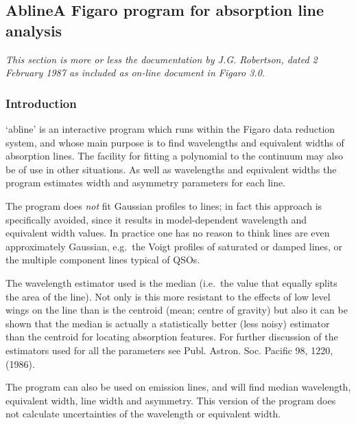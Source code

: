 
\subsection{\label{techno11}Abline\latorhtm{---}{-}A
   Figaro program for absorption line analysis}

{\em
   This section is more or less the documentation by J.G. Robertson,
   dated 2 February 1987 as included as on-line document in Figaro 3.0.
\/}


\subsubsection{\label{techno11intro}Introduction}

   `abline' is an interactive program which runs within the Figaro data
   reduction system, and whose main purpose is to find wavelengths and
   equivalent widths of absorption lines. The facility for fitting a
   polynomial to the continuum may also be of use in other situations.
   As well as wavelengths and equivalent widths the program estimates
   width and asymmetry parameters for each line.

   The program does {\em not\/}
   fit Gaussian profiles to lines; in fact this approach is specifically
   avoided, since it results in model-dependent wavelength and
   equivalent width values. In practice one has no reason to think lines
   are even approximately Gaussian, e.g.\ the Voigt profiles of saturated
   or damped lines, or the multiple component lines typical of QSOs.

   The wavelength estimator used is the median (i.e.\ the value that
   equally splits the area of the line). Not only is this more resistant
   to the effects of low level wings on the line than is the centroid
   (mean; centre of gravity) but also it can be shown that the median is
   actually a statistically better (less noisy) estimator than the
   centroid for locating absorption features.  For further discussion of
   the estimators used for all the parameters see Publ. Astron. Soc.
   Pacific 98, 1220, (1986).

   The program can also be used on emission lines, and will find median
   wavelength, equivalent width, line width and asymmetry. This version
   of the program does not calculate uncertainties of the wavelength or
   equivalent width.

